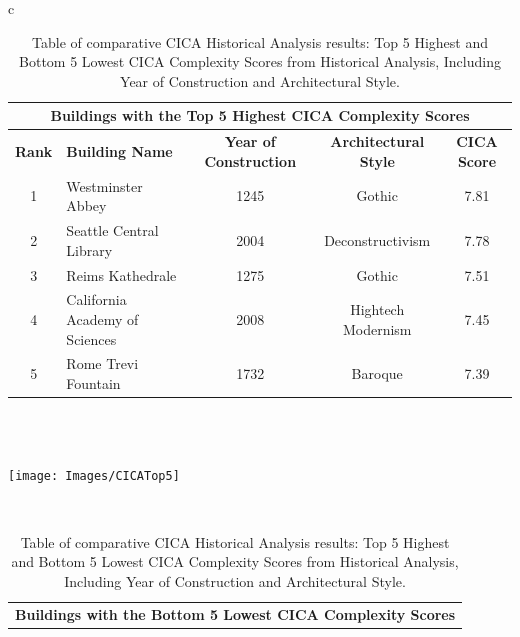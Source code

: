 \documentclass[final,5p,times]{elsarticle}
\begin{document}
\stop

\begin{table}[!htb]
\centering
\caption{Table of comparative CICA Historical Analysis results: Top 5 Highest and Bottom 5 Lowest CICA Complexity Scores from Historical Analysis, Including Year of Construction and Architectural Style.}
\label{tab:Top5andBottom5CICAcomplexityScores}
\small
\begin{tabular}{c}
    \begin{minipage}{\textwidth}
        \centering
        \begin{tabularx}{\linewidth}{c X c c c}
        \toprule
        \multicolumn{5}{c}{\textbf{Buildings with the Top 5 Highest CICA Complexity Scores}} \\
        \hline
        \textbf{Rank} & \textbf{Building Name} & \textbf{Year of Construction} & \textbf{Architectural Style} & \textbf{CICA Score} \\
        \hline
        1 & Westminster Abbey & 1245 & Gothic & 7.81 \\
        2 & Seattle Central Library & 2004 & Deconstructivism & 7.78 \\
        3 & Reims Kathedrale & 1275 & Gothic & 7.51 \\
        4 & California Academy of Sciences & 2008 & Hightech Modernism & 7.45 \\
        5 & Rome Trevi Fountain & 1732 & Baroque & 7.39 \\
        \hline
        \end{tabularx}
    \end{minipage}
    \\
    \\
    \begin{minipage}{\textwidth}
        \centering
        \texttt{[image: Images/CICATop5]}
        \label{fig:CICATop5scores}
    \end{minipage}
    \\
    \begin{minipage}{\textwidth}
        \centering
        \begin{tabularx}{\linewidth}{c X c c c}
        \hline
        \multicolumn{5}{c}{\textbf{Buildings with the Bottom 5 Lowest CICA Complexity Scores}} \\

\end{tabularx}
\end{minipage}
\end{tabular}
\end{table}
\end{document}
